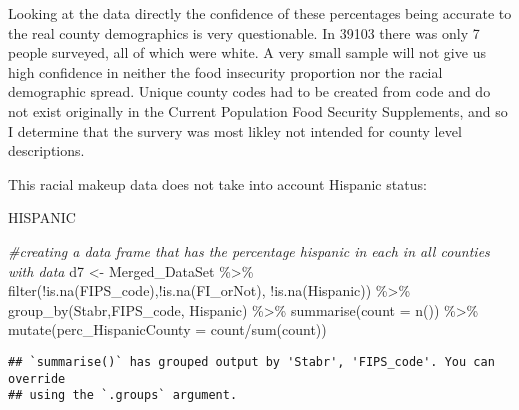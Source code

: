 \documentclass[
]{article}
\newenvironment{Shaded}{\begin{snugshade}}{\end{snugshade}}
\newcommand{\AttributeTok}[1]{\textcolor[rgb]{0.77,0.63,0.00}{#1}}
\newcommand{\CommentTok}[1]{\textcolor[rgb]{0.56,0.35,0.01}{\textit{#1}}}
\newcommand{\FunctionTok}[1]{\textcolor[rgb]{0.00,0.00,0.00}{#1}}
\newcommand{\NormalTok}[1]{#1}
\newcommand{\OtherTok}[1]{\textcolor[rgb]{0.56,0.35,0.01}{#1}}
\newcommand{\SpecialCharTok}[1]{\textcolor[rgb]{0.00,0.00,0.00}{#1}}
\begin{document}
Looking at the data directly the confidence of these percentages being
accurate to the real county demographics is very questionable. In 39103
there was only 7 people surveyed, all of which were white. A very small
sample will not give us high confidence in neither the food insecurity
proportion nor the racial demographic spread. Unique county codes had to
be created from code and do not exist originally in the Current
Population Food Security Supplements, and so I determine that the
survery was most likley not intended for county level descriptions.

This racial makeup data does not take into account Hispanic status:

HISPANIC

\begin{Shaded}
\begin{Highlighting}[]
\CommentTok{\#creating a data frame that has the percentage hispanic in each in all counties with data}
\NormalTok{d7 }\OtherTok{\textless{}{-}}\NormalTok{ Merged\_DataSet }\SpecialCharTok{\%\textgreater{}\%} \FunctionTok{filter}\NormalTok{(}\SpecialCharTok{!}\FunctionTok{is.na}\NormalTok{(FIPS\_code),}\SpecialCharTok{!}\FunctionTok{is.na}\NormalTok{(FI\_orNot), }\SpecialCharTok{!}\FunctionTok{is.na}\NormalTok{(Hispanic)) }\SpecialCharTok{\%\textgreater{}\%} 
  \FunctionTok{group\_by}\NormalTok{(Stabr,FIPS\_code, Hispanic) }\SpecialCharTok{\%\textgreater{}\%} 
  \FunctionTok{summarise}\NormalTok{(}\AttributeTok{count =} \FunctionTok{n}\NormalTok{()) }\SpecialCharTok{\%\textgreater{}\%} 
  \FunctionTok{mutate}\NormalTok{(}\AttributeTok{perc\_HispanicCounty =}\NormalTok{ count}\SpecialCharTok{/}\FunctionTok{sum}\NormalTok{(count))}
\end{Highlighting}
\end{Shaded}

\begin{verbatim}
## `summarise()` has grouped output by 'Stabr', 'FIPS_code'. You can override
## using the `.groups` argument.
\end{verbatim}
\end{document}
